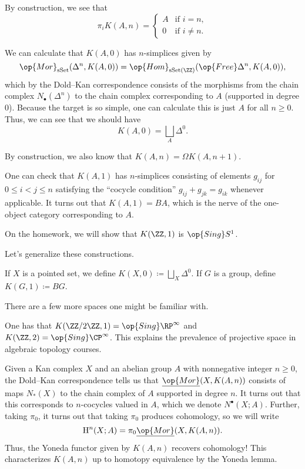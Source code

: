 \documentclass[../notes.tex]{subfiles}
\begin{document}
\begin{remark}
	By construction, we see that
	\[\pi_iK(A,n)=\begin{cases}
		A & \text{if }i=n, \\
		0 & \text{if }i\ne n.
	\end{cases}\]
\end{remark}
\begin{example}
	We can calculate that $K(A,0)$ has $n$-simplices given by
	\[\op{Mor}_{\mathrm{sSet}}(\Delta^n,K(A,0))=\op{Hom}_{\mathrm{sSet}(\ZZ)}(\op{Free}\Delta^n,K(A,0)),\]
	which by the Dold--Kan correspondence consists of the morphisms from the chain complex $N_\bullet(\Delta^n)$ to the chain complex corresponding to $A$ (supported in degree $0$). Because the target is so simple, one can calculate this is just $A$ for all $n\ge0$. Thus, we can see that we should have
	\[K(A,0)=\bigsqcup_A\Delta^0.\]
\end{example}
\begin{example}
	By construction, we also know that $K(A,n)=\Omega K(A,n+1)$.
\end{example}
\begin{example}
	One can check that $K(A,1)$ has $n$-simplices consisting of elements $g_{ij}$ for $0\le i<j\le n$ satisfying the ``cocycle condition'' $g_{ij}+g_{jk}=g_{ik}$ whenever applicable. It turns out that $K(A,1)=BA$, which is the nerve of the one-object category corresponding to $A$.
\end{example}
\begin{example}
	On the homework, we will show that $K(\ZZ,1)$ is $\op{Sing}S^1$.
\end{example}
Let's generalize these constructions.
\begin{notation}
	If $X$ is a pointed set, we define $K(X,0)\coloneqq\bigsqcup_X\Delta^0$. If $G$ is a group, define $K(G,1)\coloneqq BG$.
\end{notation}
There are a few more spaces one might be familiar with.
\begin{example}
	One has that $K(\ZZ/2\ZZ,1)=\op{Sing}\RP^\infty$ and $K(\ZZ,2)=\op{Sing}\CP^\infty$. This explains the prevalence of projective space in algebraic topology courses.
\end{example}
\begin{remark}
	Given a Kan complex $X$ and an abelian group $A$ with nonnegative integer $n\ge0$, the Dold--Kan correspondence tells us that $\underline{\op{Mor}}(X,K(A,n))$ consists of maps $N_*(X)$ to the chain complex of $A$ supported in degree $n$. It turns out that this corresponds to $n$-cocycles valued in $A$, which we denote $N^\bullet(X;A)$. Further, taking $\pi_0$, it turns out that taking $\pi_0$ produces cohomology, so we will write
	\[\mathrm H^n(X;A)=\pi_0\underline{\op{Mor}}(X,K(A,n)).\]
	Thus, the Yoneda functor given by $K(A,n)$ recovers cohomology! This characterizes $K(A,n)$ up to homotopy equivalence by the Yoneda lemma.
\end{remark}
\end{document}
